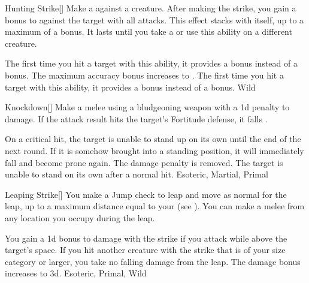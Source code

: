 \lowercase{\hypertarget{maneuver:Hunting Strike}{}}\label{maneuver:Hunting Strike}
\hypertarget{maneuver:Hunting Strike}{}
\begin{freeability}{Hunting Strike}[]
Make a  against a creature.
After making the strike, you gain a  bonus to  against the target with all attacks.
This effect stacks with itself, up to a maximum of a  bonus.
It lasts until you take a  or use this ability on a different creature.

\rankline
{} The first time you hit a target with this ability, it provides a  bonus instead of a  bonus.
 The maximum accuracy bonus increases to .
 The first time you hit a target with this ability, it provides a  bonus instead of a  bonus.
 Wild
\end{freeability}
\vspace{0.25em}



\lowercase{\hypertarget{maneuver:Knockdown}{}}\label{maneuver:Knockdown}
\hypertarget{maneuver:Knockdown}{}
\begin{freeability}{Knockdown}[]
Make a melee  using a bludgeoning weapon with a \minus1d penalty to damage.
If the attack result hits the target's Fortitude defense,
it falls .

\rankline
{} On a critical hit, the target is unable to stand up on its own until the end of the next round.
If it is somehow brought into a standing position, it will immediately fall and become prone again.
 The damage penalty is removed.
 The target is unable to stand on its own after a normal hit.
 Esoteric, Martial, Primal
\end{freeability}
\vspace{0.25em}



\lowercase{\hypertarget{maneuver:Leaping Strike}{}}\label{maneuver:Leaping Strike}
\hypertarget{maneuver:Leaping Strike}{}
\begin{freeability}{Leaping Strike}[]
You make a Jump check to leap and move as normal for the leap, up to a maximum distance equal to your  (see ).
You can make a melee  from any location you occupy during the leap.

\rankline
{} You gain a \plus1d bonus to damage with the strike if you attack while above the target's space.
 If you hit another creature with the strike that is of your size category or larger, you take no falling damage from the leap.
 The damage bonus increases to \plus3d.
 Esoteric, Primal, Wild
\end{freeability}
\vspace{0.25em}



